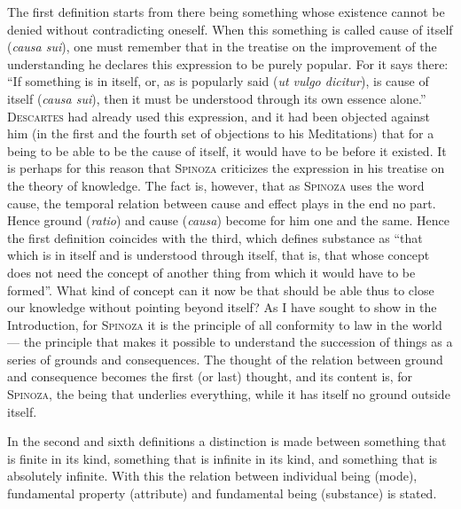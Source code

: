 \documentclass[12pt]{article}
\newcommand{\opage}[1]{\marginnote{\footnotesize\textit{[#1]}}}
\begin{document}
The first definition starts from there being something whose existence cannot be
denied without contradicting oneself. When this something is called cause of itself
(\textit{causa sui}), one must remember that in the treatise on the improvement of
the understanding he declares this expression to be purely popular. For it says
there: ``If something is in itself, or, as is popularly said (\textit{ut vulgo
dicitur}), is cause of itself (\textit{causa sui}), then it must be understood
through its own essence alone.'' \textsc{Descartes} had already used this
expression, and it had been objected against him (in the first and the fourth set
of objections to his Meditations) that for a being to be able to be the cause of
itself, it would have to be before it existed. It is perhaps for this reason that
\textsc{Spinoza} criticizes the expression in his treatise on the theory of
knowledge. The fact is, however, that as \textsc{Spinoza} uses the word cause, the
temporal relation between cause and effect plays in the end no part. Hence ground
(\textit{ratio}) and cause (\textit{causa}) become for him one and the same. Hence
the first definition coincides with the third, which defines substance as ``that
which is in itself and is understood through itself, that is, that whose concept
does not need the concept of another thing from which it would have to be formed''.
\opage{15}What kind of concept can it now be that should be able thus to close our
knowledge without pointing beyond itself? As I have sought to show in the
Introduction, for \textsc{Spinoza} it is the principle of all conformity to law in
the world --- the principle that makes it possible to understand the succession of
things as a series of grounds and consequences. The thought of the relation between
ground and consequence becomes the first (or last) thought, and its content is, for
\textsc{Spinoza}, the being that underlies everything, while it has itself no ground
outside itself.

In the second and sixth definitions a distinction is made between something that is
finite in its kind, something that is infinite in its kind, and something that is
absolutely infinite. With this the relation between individual being (mode),
fundamental property (attribute) and fundamental being (substance) is stated.
\end{document}
